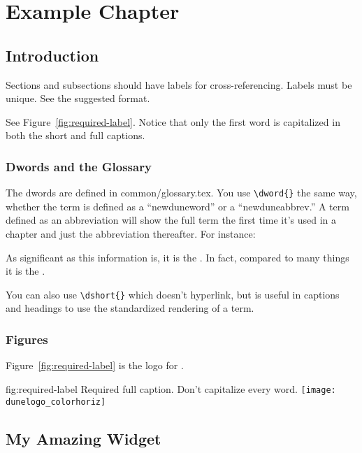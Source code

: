 \chapter{Example Chapter}
\label{ch:chap-id}

\section{Introduction}
\label{sec:chap-id:intro}

Sections and subsections should have labels for cross-referencing. Labels must be unique. See the suggested format.

See Figure~\ref{fig:required-label}. Notice that only the first word is capitalized in both the short and full captions.  

\subsection{Dwords and the Glossary}
\label{sec:chap-id:intro}

The dwords are defined in common/glossary.tex. You use \verb|\dword{}| the same way, whether the term is defined as a ``newduneword'' or a ``newduneabbrev.''  A term defined as an abbreviation will show the full term the first time it's used in a chapter and just the abbreviation thereafter.  For instance:

As significant as this information is, it is the . In fact, compared to many things it is the .

You can also use \verb|\dshort{}| which doesn't hyperlink, but is useful in captions and headings to use the standardized rendering of a term.

\subsection{Figures}
\label{sec:chap-id:intro}


Figure~\ref{fig:required-label} is the logo for . 

\begin{dunefigure}
{fig:required-label}
{Required full caption. Don't capitalize every word.}
\texttt{[image: dunelogo\_colorhoriz]}
\end{dunefigure}

\section{My Amazing Widget}
\label{sec:chap-id:mywidget}

